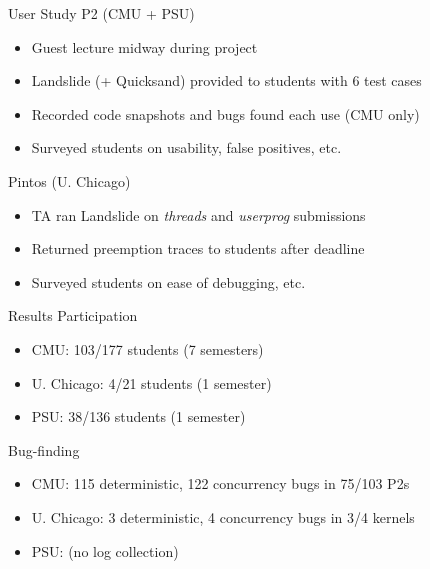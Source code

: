 \documentclass[xcolor=dvipsnames]{beamer}
\begin{document}
\begin{frame}{User Study}
	P2 (CMU + PSU)
	\begin{itemize}
		\item Guest lecture midway during project
		\item Landslide (+ Quicksand) provided to students with 6 test cases %
		\item Recorded code snapshots and bugs found each use (CMU only)
		\item Surveyed students on usability, false positives, etc.
	\end{itemize}
	\pause
	\linegap

	Pintos (U. Chicago)
	\begin{itemize}
		\item TA %
			ran Landslide on {\em threads} and {\em userprog} submissions
		\item Returned preemption traces to students after deadline
		\item Surveyed students on ease of debugging, etc.
	\end{itemize}
\end{frame}

\begin{frame}{Results}
	Participation
	\begin{itemize}
		\item CMU: 103/177 students (7 semesters)
		\item U. Chicago: 4/21 students (1 semester)
		\item PSU: 38/136 students (1 semester)
	\end{itemize}
	\linegap

	Bug-finding
	\begin{itemize}
		\item CMU: 115 deterministic, 122 concurrency bugs in 75/103 P2s
		\item U. Chicago: 3 deterministic, 4 concurrency bugs in 3/4 kernels
		\item PSU: (no log collection) %
	\end{itemize}
\end{frame}
\end{document}
